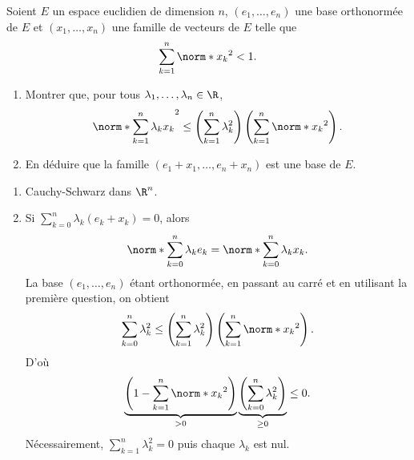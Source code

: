 \begin{enonce}
\begin{exercise}[ID={RMS132 E1147},subtitle={Oral CCINP PSI 2021},tags={mpsi},difficulty{}]
  Soient $E$ un espace euclidien de dimension $n$, $\left( e_1,\dots,e_n \right)$ une base orthonormée de $E$ et $\left( x_1,\dots,x_n \right)$ une famille de vecteurs de $E$ telle que
  \begin{equation*}
    \sum_{k=1}^n \norm*{x_k}^2 < 1.
  \end{equation*}
  \begin{enumerate}
    \item Montrer que, pour tous $\lambda_1,\dots, \lambda_n \in\R$,
      \begin{equation*}
        \norm*{\sum_{k=1}^n \lambda_k x_k}^2
        \leq
        \left( \sum_{k=1}^n \lambda_k^2 \right) \left( \sum_{k=1}^n \norm*{x_k}^2 \right).
      \end{equation*}

    \item En déduire que la famille $\left( e_1+x_1, \dots, e_n + x_n \right)$ est une base de $E$.
  \end{enumerate}
\end{exercise}
\begin{solution}
  \begin{enumerate}
    \item Cauchy-Schwarz dans $\R^n$.

    \item Si $\sum_{k=0}^n \lambda_k (e_k + x_k) = 0$, alors
      \begin{equation*}
        \norm*{\sum_{k=0}^n \lambda_k e_k} = \norm*{\sum_{k=0}^n \lambda_k x_k}.
      \end{equation*}
      La base $(e_1,\dots,e_n)$ étant orthonormée, en passant au carré et en utilisant la première question, on obtient
      \begin{equation*}
        \sum_{k=0}^n \lambda_k^2 
        \leq
        \left( \sum_{k=1}^n \lambda_k^2 \right) \left( \sum_{k=1}^n \norm*{x_k}^2 \right).
      \end{equation*}
      D'où
      \begin{equation*}
        \underbrace{\left(1-\sum_{k=1}^n\norm*{x_k}^2\right)}_{>0} \underbrace{\left(\sum_{k=0}^n \lambda_k^2\right)}_{\geq 0} \leq 0.
      \end{equation*}
      Nécessairement, $\sum_{k=1}^n \lambda_k^2 = 0$ puis chaque $\lambda_k$ est nul.
  \end{enumerate}
\end{solution}
\end{enonce}
